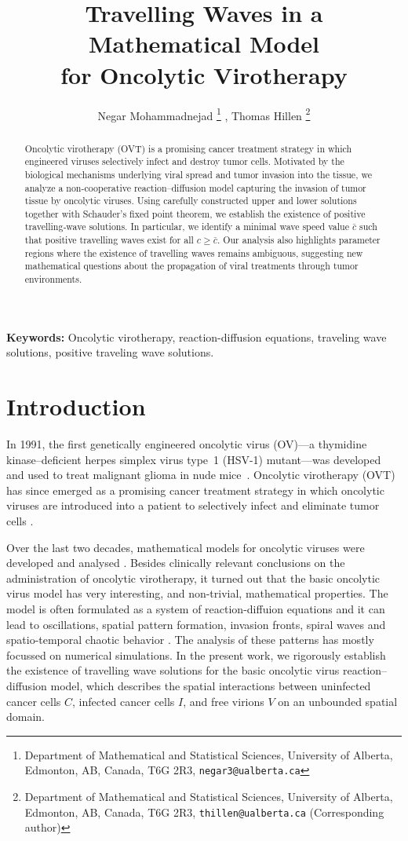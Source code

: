 \documentclass[11pt]{article}
\title{Travelling Waves 
in a Mathematical Model \\for 
Oncolytic Virotherapy}
\author{Negar Mohammadnejad \thanks{Department of Mathematical and Statistical Sciences, University of Alberta, Edmonton, AB, Canada, T6G 2R3, \texttt{negar3@ualberta.ca}} , Thomas Hillen \thanks{Department of Mathematical and Statistical Sciences, University of Alberta, Edmonton, AB, Canada, T6G 2R3,  \texttt{thillen@ualberta.ca} (Corresponding author)}}
\date{}
\theoremstyle{definition}
\begin{document}
\maketitle

\begin{abstract}
    Oncolytic virotherapy (OVT) is a promising cancer treatment strategy in which engineered viruses selectively infect and destroy tumor cells. Motivated by the biological mechanisms underlying viral spread and tumor invasion into the tissue, we analyze a non-cooperative reaction–diffusion model capturing the invasion of tumor tissue by oncolytic viruses. Using carefully constructed upper and lower solutions together with Schauder’s fixed point theorem, we establish the existence of positive travelling‐wave solutions. In particular, we identify a minimal wave speed value $\bar{c}$
  such that positive travelling waves exist for all $c \ge \bar{c}$. Our analysis also highlights parameter regions where the existence of travelling waves remains ambiguous, suggesting new mathematical questions about the propagation of viral treatments through tumor environments.
\end{abstract}
\textbf{Keywords:} Oncolytic virotherapy, reaction-diffusion equations, traveling wave solutions, positive traveling wave solutions.
\section{Introduction} 

In 1991, the first genetically engineered oncolytic virus (OV)---a thymidine kinase–deficient herpes simplex virus type~1 (HSV-1) mutant---was developed and used to treat malignant glioma in nude mice~\cite{viro_intro}. Oncolytic virotherapy (OVT) has since emerged as a promising cancer treatment strategy in which oncolytic viruses are introduced into a patient to selectively infect and eliminate tumor cells \cite{LinDanni2023Ovbp}. 

Over the last two decades, mathematical models for oncolytic viruses were developed and analysed \cite{WodarzKamorva009,KomorovaWodarz2010,Tian,eftimie,BhattDarshakKartikey2022Mtsd,storey,Jenner2019,MorselliDavid2023AaCM,arwa,alturqwi}.
Besides clinically relevant conclusions on the administration of oncolytic virotherapy, it turned out that the basic oncolytic virus model has very interesting, and non-trivial, mathematical properties. The model is often formulated as a system of reaction-diffuion equations and it can lead to oscillations, spatial pattern formation, invasion fronts, spiral waves  and spatio-temporal chaotic behavior \cite{POOLADVAND2021108520,eftimie,Tejas2025}. 
The analysis of these patterns has mostly focussed on numerical simulations. In the present work, we rigorously establish the existence of travelling wave solutions for the basic oncolytic virus reaction--diffusion model, which describes the spatial interactions between uninfected cancer cells $C$, infected cancer cells $I$, and free virions $V$ on an unbounded spatial domain.
\end{document}
